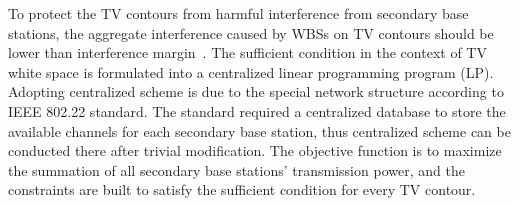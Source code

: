  
To protect the TV contours from harmful interference from secondary base stations, the aggregate interference caused by WBSs on TV contours should be lower than interference margin~\cite{multipleIntf_pimrc11}.
The sufficient condition in the context of TV white space is formulated into a centralized linear programming program (LP).
Adopting centralized scheme is due to the special network structure according to IEEE 802.22 standard. 
The standard required a centralized database to store the available channels for each secondary base station, thus centralized scheme can be conducted there after trivial modification.
The objective function is to maximize the summation of all secondary base stations' transmission power, and the constraints are built to satisfy the sufficient condition for every TV contour. %



